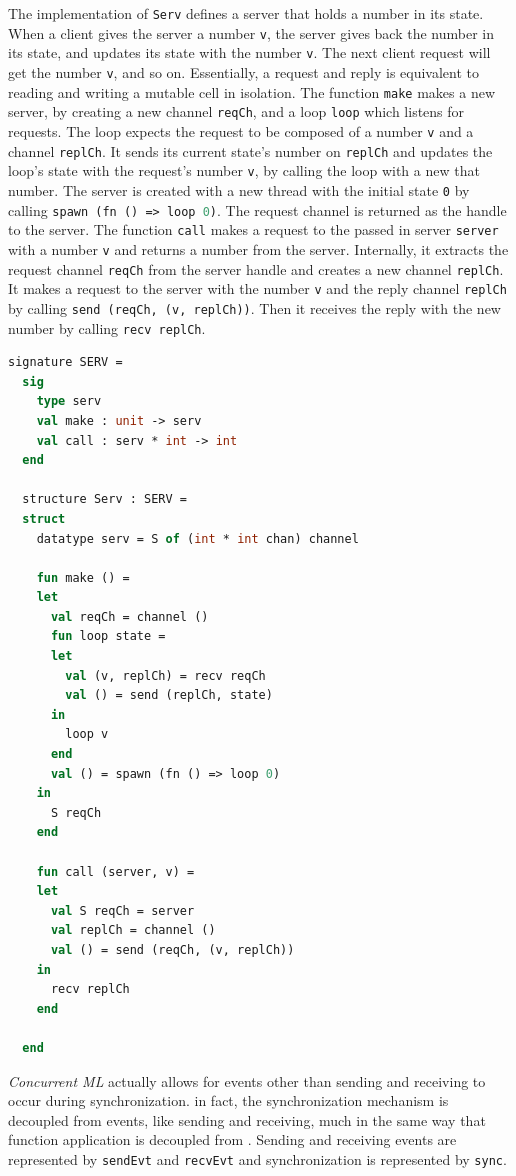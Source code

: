 \documentclass[letterpaper, 11pt]{extarticle}
\begin{document}
The implementation of \lstinline{Serv} defines a server that holds a number in its state.
When a client gives the server a number \lstinline{v}, the server gives back the number in
its state, and updates its state with the number \lstinline{v}.  The next client request will
get the number \lstinline{v}, and so on. Essentially, a request and reply is equivalent
to reading and writing a mutable cell in isolation. The function \lstinline{make} makes a new
server, by creating a new channel \lstinline{reqCh}, and a loop \lstinline{loop} which listens
for requests. The loop expects the request to be composed of a number \lstinline{v} and a
channel \lstinline{replCh}. It sends its current state's number on \lstinline{replCh} and
updates the loop's state with the request's number \lstinline{v}, by calling the loop with a
new that number. The server is created with a new thread with the initial state \lstinline{0}
by calling \lstinline[language=ML]{spawn (fn () => loop 0)}. The request channel is returned
as the handle to the server.  The function \lstinline{call} makes a request to the passed in
server \lstinline{server} with a number \lstinline{v} and returns a number from the
server. Internally, it extracts the request channel \lstinline{reqCh} from the
server handle and creates a new channel \lstinline{replCh}. It makes a request to the server
with the number \lstinline{v} and the reply channel \lstinline{replCh} by calling
\lstinline{send (reqCh, (v, replCh))}. Then it receives the reply with the new number by
calling \lstinline{recv replCh}.


\begin{lstlisting}[language=ML, mathescape]
  signature SERV =
  sig 
    type serv
    val make : unit -> serv
    val call : serv * int -> int
  end

  structure Serv : SERV =
  struct 
    datatype serv = S of (int * int chan) channel 

    fun make () =
    let 
      val reqCh = channel ()
      fun loop state =
      let
        val (v, replCh) = recv reqCh
        val () = send (replCh, state)
      in
        loop v
      end
      val () = spawn (fn () => loop 0)
    in
      S reqCh
    end 

    fun call (server, v) =
    let 
      val S reqCh = server
      val replCh = channel () 
      val () = send (reqCh, (v, replCh))
    in
      recv replCh
    end

  end
\end{lstlisting}


\textit{Concurrent ML} actually allows for events other than sending and receiving to
occur during synchronization. in fact, the synchronization mechanism is decoupled from
events, like sending and receiving, much in the same way that function application is decoupled
from . Sending and receiving events are represented by \lstinline{sendEvt}
and \lstinline{recvEvt} and synchronization is represented by \lstinline{sync}.
\end{document}
